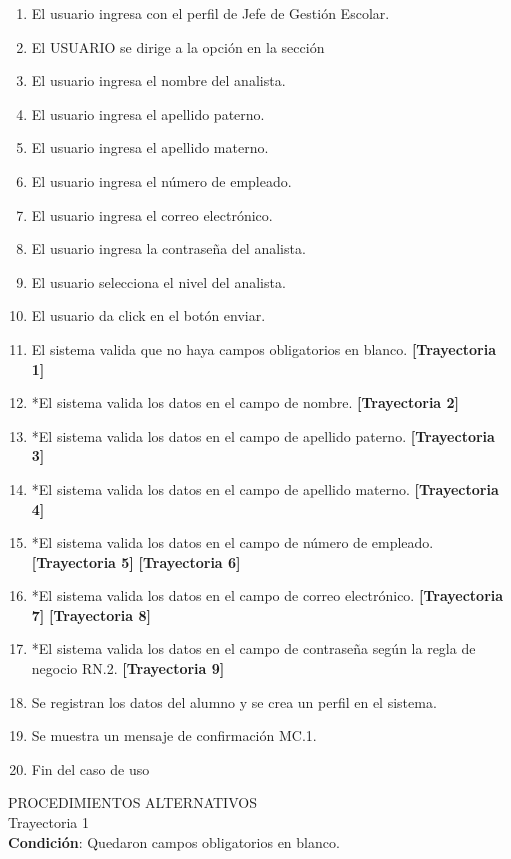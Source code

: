 \begin{enumerate}
    \item El usuario ingresa con el perfil de Jefe de Gestión Escolar.
    \item El USUARIO se dirige a la opción en la sección
    \item El usuario ingresa el nombre del analista.
    \item El usuario ingresa el apellido paterno.
    \item El usuario ingresa el apellido materno.
    \item El usuario ingresa el número de empleado.
    \item El usuario ingresa el correo electrónico.
    \item El usuario ingresa la contraseña del analista.
    \item El usuario selecciona el nivel del analista.
    \item El usuario da click en el botón enviar.
    \item El sistema valida que no haya campos obligatorios en blanco. \textbf{[Trayectoria 1]}
    \item *El sistema valida los datos en el campo de nombre. \textbf{[Trayectoria 2]}
    \item *El sistema valida los datos en el campo de apellido paterno. \textbf{[Trayectoria 3]}
    \item *El sistema valida los datos en el campo de apellido materno. \textbf{[Trayectoria 4]}
    \item *El sistema valida los datos en el campo de número de empleado. \textbf{[Trayectoria 5]} \textbf{[Trayectoria 6]}
    \item *El sistema valida los datos en el campo de correo electrónico. \textbf{[Trayectoria 7]} \textbf{[Trayectoria 8]}
    \item *El sistema valida los datos en el campo de contraseña según la regla de negocio RN.2. \textbf{[Trayectoria 9]}
    \item Se registran los datos del alumno y se crea un perfil en el sistema.
    \item Se muestra un mensaje de confirmación MC.1.
    \item Fin del caso de uso
\end{enumerate}
\vspace*{1cm}
\Large{PROCEDIMIENTOS ALTERNATIVOS}\\
\large{Trayectoria 1}\\
\textbf{Condición}: Quedaron campos obligatorios en blanco.

